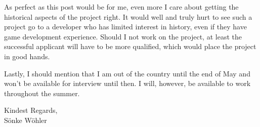 \documentclass[paper=a4,fontsize=11pt]{scrartcl} %
\newcommand{\sepspace}{\vspace*{1em}}		%
\begin{document}
    
    \noindent
    As perfect as this post would be for me, even more I care about getting the historical aspects of the project right. It would well and truly hurt to see such a project go to a developer who has limited interest in history, even if they have game development experience. Should I not work on the project, at least the successful applicant will have to be more qualified, which would place the project in good hands.
    \sepspace
    
    
    \noindent
    Lastly, I should mention that I am out of the country until the end of May and won't be available for interview until then. I will, however, be available to work throughout the summer.


  \sepspace
  
  \noindent
  Kindest Regards, \\
  S\"onke W\"ohler
  
  
  
\end{document}
